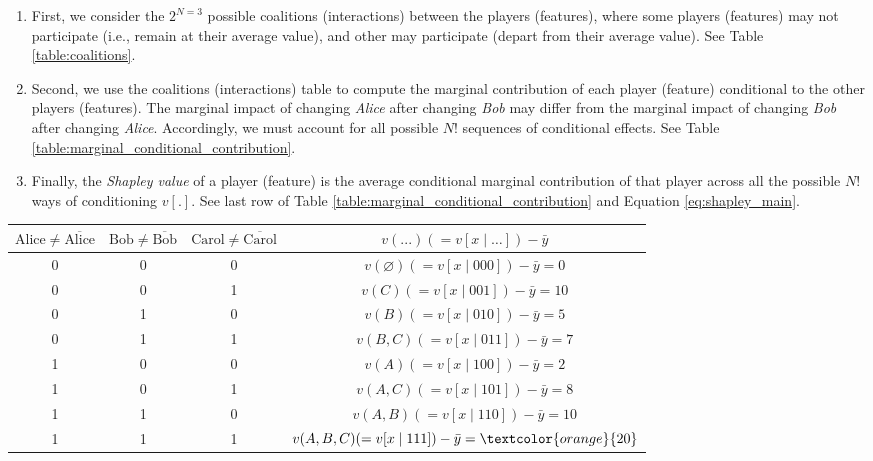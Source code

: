 \begin{enumerate}
    \item First, we consider the $2^{N=3}$ possible coalitions (interactions) between the players (features), where some players (features) may not participate (i.e., remain at their average value), and other may participate (depart from their average value). See Table \ref{table:coalitions}.
    \item Second, we use the coalitions (interactions) table to compute the marginal contribution of each player (feature) conditional to the other players (features). The marginal impact of changing \emph{Alice} after changing \emph{Bob} may differ from the marginal impact of changing \emph{Bob} after changing \emph{Alice}. Accordingly, we must account for all possible $N!$ sequences of conditional effects. See Table \ref{table:marginal_conditional_contribution}.
    \item Finally, the \emph{Shapley value} of a player (feature) is the average conditional marginal contribution of that player across all the possible $N!$ ways of conditioning $v[.]$. See last row of Table \ref{table:marginal_conditional_contribution} and Equation \ref{eq:shapley_main}.
\end{enumerate}

\begin{table*}
\centering
\begin{tabular}{|c|c|c|c|}
\hline $\text{Alice} \neq \overline{\text{Alice}}$ & $\text{Bob} \neq \overline{\text{Bob}}$ & $\text{Carol} \neq \overline{\text{Carol}}$ & $v(...) \left(= v[x \mid \ldots]\right)-\bar{y}$ \\
\hline 0 & 0 & 0 & $v(\varnothing) (= v[x \mid 000])-\bar{y} = 0$ \\
\hline 0 & 0 & 1 & $v(C) (= v[x \mid 001])-\bar{y} = 10$ \\
\hline 0 & 1 & 0 & $v(B) (= v[x \mid 010])-\bar{y} = 5$ \\
\hline 0 & 1 & 1 & $v(B,C) (= v[x \mid 011])-\bar{y} = 7$ \\
\hline 1 & 0 & 0 & $v(A) (= v[x \mid 100])-\bar{y} = 2$ \\
\hline 1 & 0 & 1 & $v(A,C) (= v[x \mid 101])-\bar{y} = 8$ \\
\hline 1 & 1 & 0 & $v(A,B) (= v[x \mid 110])-\bar{y} = 10$ \\
\hline 1 & 1 & 1 & $v(A,B,C) (= v[x \mid 111])-\bar{y} = \textcolor{orange}{20}$ \\
\hline
\end{tabular}
\caption{In a model with 3 features, there are $2^{3}=8$ possible interactions. For each interaction, we compute the departure of the model's forecast from its baseline (average value). We encode as `1' a feature that is not at its average value (it forms part of a \emph{coalition}), and `0' a feature that is at its average value. Thus $v(A,B)=v(B,A)$, $v(B,C)=v(C,A)$, $v(A,C)=v(C,A)$, and $v(A,B,C)=v(B,A,C)=v(A,C,B)$.}
\label{table:coalitions}
\end{table*}

